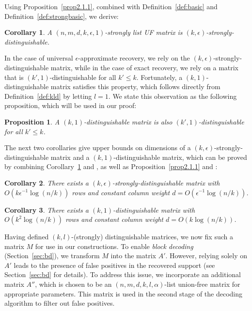 \documentclass{article}
\newtheorem{corollary}{Corollary}[subsection]
\newtheorem{proposition}{Proposition}[subsection]
\begin{document}
Using Proposition~\ref{prop2.1.1}, combined with Definition~\ref{def:basic} and Definition~\ref{def:strongbasic}, we derive: 
\begin{corollary}\label{cor2.1.1}
    A $(n,m,d,k,\epsilon, 1)$-strongly list UF matrix is $(k,\epsilon)$-strongly-distinguishable.
\end{corollary}

In the case of universal $\epsilon$-approximate recovery, we rely on the $(k,\epsilon)$-strongly-distinguishable matrix, while in the case of exact recovery, we rely on a matrix that is $(k',1)$-distinguishable for all $k'\leq k$. Fortunately, a $(k,1)$-distinguishable matrix satisfies this property, which follows directly from Definition~\ref{def:kld} by letting $l=1$. We state this observation as the following proposition, which will be used in our proof:
\begin{proposition}\label{lem:k1d}
    A $(k,1)$-distinguishable matrix is also $(k',1)$-distinguishable for all $k'\leq k$. 
\end{proposition}

The next two corollaries give upper bounds on dimensions of a $(k,\epsilon)$-strongly-distinguishable matrix and a $(k,1)$-distinguishable matrix, which can be proved by 
combining Corollary~\ref{cor2.1.1} and \cite[Corollary~1]{matsumoto2023improved}, as well as Proposition~\ref{prop2.1.1} and \cite[Lemma~2.3]{matsumoto2023improved}: 
\begin{corollary}\label{col:sdm}
    There exists a $(k,\epsilon)$-strongly-distinguishable matrix with $O(k\epsilon^{-1}\log(n/k))$ rows and constant column weight $d=O(\epsilon^{-1}\log(n/k))$. 
\end{corollary}
\begin{corollary}\label{col:dm}
    There exists a $(k,1)$-distinguishable matrix with $O(k^2\log(n/k))$ rows and constant column weight $d=O(k\log(n/k))$. 
\end{corollary}

Having defined $(k,l)$-(strongly) distinguishable matrices, we now fix such a matrix $M$ for use in our constructions. To enable \emph{block decoding} (Section~\ref{sec:bd}), we transform $M$ into the matrix $A'$. However, relying solely on $A'$ leads to the presence of false positives in the recovered support (see Section~\ref{sec:bd} for details). To address this issue, we incorporate an additional matrix $A''$, which is chosen to be an $(n,m,d,k,l,\alpha)$-list union-free matrix for appropriate parameters. This matrix is used in the second stage of the decoding algorithm to filter out false positives.
\end{document}
